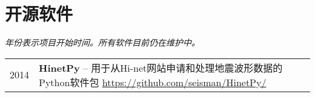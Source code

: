 \section{开源软件}

\emph{年份表示项目开始时间。所有软件目前仍在维护中。}

\begin{tabular}{p{} p{}}
2014 & \textbf{HinetPy} -- 用于从Hi-net网站申请和处理地震波形数据的Python软件包 \newline
       \url{https://github.com/seisman/HinetPy/} \\
\end{tabular}
